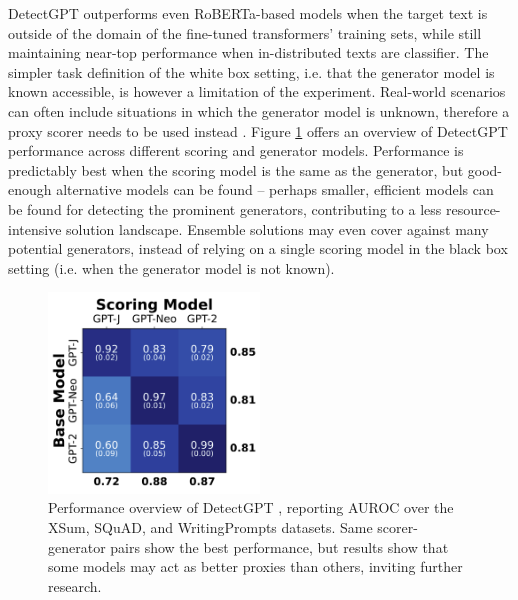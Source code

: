 DetectGPT outperforms even RoBERTa-based models when the target text is outside of the domain of the fine-tuned transformers' training sets, while still maintaining near-top performance when in-distributed texts are classifier.
The simpler task definition of the white box setting, i.e. that the generator model is known accessible, is however a limitation of the experiment.
Real-world scenarios can often include situations in which the generator model is unknown, therefore a proxy scorer needs to be used instead \citep{mireshghallah2023smaller}.
Figure \ref{fig:detectgpt} offers an overview of DetectGPT performance across different scoring and generator models.
Performance is predictably best when the scoring model is the same as the generator, but good-enough alternative models can be found -- perhaps smaller, efficient models can be found for detecting the prominent generators, contributing to a less resource-intensive solution landscape.
Ensemble solutions may even cover against many potential generators, instead of relying on a single scoring model in the black box setting (i.e. when the generator model is not known).

\begin{figure}[ht]
    \centering
    \includegraphics[width=0.5\textwidth]{assets/detectgpt_modelcomp.png}
    \caption{
        Performance overview of DetectGPT \citep{mitchell2023detectgptzeroshotmachinegeneratedtext}, reporting AUROC \citep{bradley1997use} over the XSum, SQuAD, and WritingPrompts datasets.
        Same scorer-generator pairs show the best performance, but results show that some models may act as better proxies than others, inviting further research.
    }
    \label{fig:detectgpt}
\end{figure}

